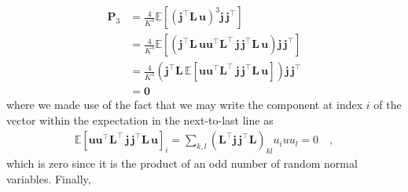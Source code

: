 \documentclass[modern]{aastex62}
\begin{document}
    \begin{align}
        \mathbf{P}_3 & = \frac{4}{K^3}\mathbb{E}\left[ \left(\mathbf{j}^\top \mathbf{L} \, \mathbf{u}\right)^3 \mathbf{j} \, \mathbf{j}^\top \right]
        \nonumber                                                                                                                                                                                                                               \\
                     & = \frac{4}{K^3}\mathbb{E}\left[\left(\mathbf{j}^\top \mathbf{L} \,  \mathbf{u} \mathbf{u}^\top  \mathbf{L}^\top \, \mathbf{j} \, \mathbf{j}^\top \mathbf{L} \,  \mathbf{u} \right) \mathbf{j} \, \mathbf{j}^\top \right]
        \nonumber                                                                                                                                                                                                                               \\
                     & = \frac{4}{K^3}\left(\mathbf{j}^\top \mathbf{L} \,  \mathbb{E}\left[\mathbf{u} \mathbf{u}^\top  \mathbf{L}^\top \, \mathbf{j} \, \mathbf{j}^\top \mathbf{L} \,  \mathbf{u}\right] \right) \mathbf{j} \, \mathbf{j}^\top
        \nonumber                                                                                                                                                                                                                               \\
                     & = \mathbf{0}
    \end{align}
    where we made use of the fact that we may write the component at index $i$ of the vector within the expectation in the next-to-last line
    as
    \begin{align}
        \mathbb{E}\left[\mathbf{u} \mathbf{u}^\top  \mathbf{L}^\top \, \mathbf{j} \, \mathbf{j}^\top \mathbf{L} \,  \mathbf{u}\right]_{i} = \sum\limits_{k,l}(\mathbf{L}^\top \mathbf{j} \, \mathbf{j}^\top \mathbf{L})_{kl} u_i u u_l = 0
        \quad,
        \nonumber
    \end{align}
    which is zero since it is the product of an odd number of random normal variables.
    Finally,
\end{document}
